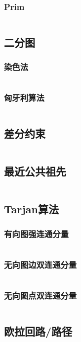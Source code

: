 \documentclass[a4paper,12pt]{article}
\begin{document}
\subsubsection{Prim} 
\inputminted[breaklines, linenos]{c++}{graph/mst/prim.cc}
\subsection{二分图} %
\subsubsection{染色法} 
\inputminted[breaklines, linenos]{c++}{graph/2graph/judge.cc}
\subsubsection{匈牙利算法} 
\inputminted[breaklines, linenos]{c++}{graph/2graph/xyl.cc}
\subsection{差分约束} %
\inputminted[breaklines, linenos]{c++}{graph/cfys/cfys.cc}
\subsection{最近公共祖先} %
\inputminted[breaklines, linenos]{c++}{graph/lca/lca.cc}
\subsection{Tarjan算法} %
\subsubsection{有向图强连通分量} 
\inputminted[breaklines, linenos]{c++}{graph/tarjan/scc.cc}
\subsubsection{无向图边双连通分量} 
\inputminted[breaklines, linenos]{c++}{graph/tarjan/edcc.cc}
\subsubsection{无向图点双连通分量} 
\inputminted[breaklines, linenos]{c++}{graph/tarjan/vdcc.cc}
\subsection{欧拉回路/路径} %
\inputminted[breaklines, linenos]{c++}{graph/eluer/eluer.cc}
\end{document}
